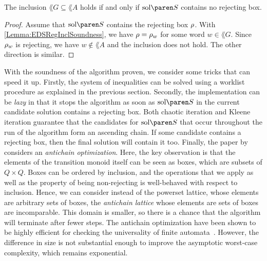 \documentclass[../../diss.tex]{subfiles}
\begin{document}
%
\cheatpagebreak
%

\begin{proposition}%
\label{Proposition:EDSRegInclSoundness}%
    The inclusion $\lang{G} \subseteq \lang{A}$ holds if and only if $\sol{S}$ contains no rejecting box.
\end{proposition}

\begin{proof}
    Assume that $\sol{S}$ contains the rejecting box $\tbox$.
    With \cref{Lemma:EDSRegInclSoundness}, we have $\tbox = \tbox{w}$ for some word $w \in \lang{G}$.
    Since $\tbox{w}$ is rejecting, we have $w \not\in \lang{A}$ and the inclusion does not hold.
    The other direction is similar.
\end{proof}

With the soundness of the algorithm proven, we consider some tricks that can speed it up.
Firstly, the system of inequalities can be solved using a worklist procedure as explained in the previous section.
Secondly, the implementation can be \emph{lazy} in that it stops the algorithm as soon as $\sol{S}$ in the current candidate solution contains a rejecting box.
Both chaotic iteration and Kleene iteration guarantee that the candidates for $\sol{S}$ that occur throughout the run of the algorithm form an ascending chain.
If some candidate contains a rejecting box, then the final solution will contain it too.
Finally, the paper by  considers an \emph{antichain optimization}.
Here, the key observation is that the elements of the transition monoid itself can be seen as boxes, which are subsets of $Q \times Q$.
Boxes can be ordered by inclusion, and the operations that we apply as well as the property of being non-rejecting is well-behaved with respect to inclusion.
Hence, we can consider instead of the powerset lattice, whose elements are arbitrary sets of boxes, the \emph{antichain lattice} whose elements are sets of boxes are incomparable.
This domain is smaller, so there is a chance that the algorithm will terminate after fewer steps.
The antichain optimization have been shown to be highly efficient \eg for checking the universality of finite automata~\cite{CaludeJKLS17}.
However, the difference in size is not substantial enough to improve the asymptotic worst-case complexity, which remains exponential.
\end{document}
